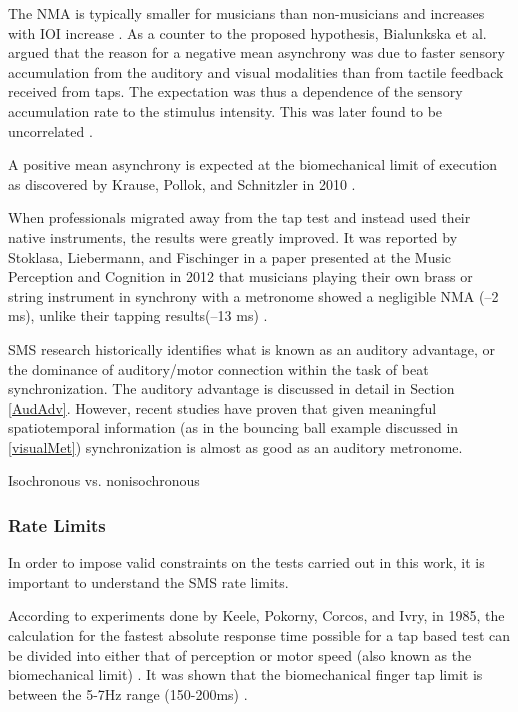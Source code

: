 The NMA is typically smaller for musicians than non-musicians and increases with IOI increase \cite{repp2013sensorimotor}. As a counter to the proposed hypothesis, Bialunkska et al. argued that the reason for a negative mean asynchrony was due to faster sensory accumulation from the auditory and visual modalities than from tactile feedback received from taps. The expectation was thus a dependence of the sensory accumulation rate to the stimulus intensity. This was later found to be uncorrelated \cite{bialunska2011increasing}.

A positive mean asynchrony is expected at the biomechanical limit of execution as discovered by Krause, Pollok, and Schnitzler in 2010 \cite{krause2010perception}.

When professionals migrated away from the tap test and instead used their native instruments, the results were greatly improved. It was reported by Stoklasa, Liebermann, and Fischinger in a paper presented at the Music Perception and Cognition in 2012 that musicians playing their own brass or string instrument in synchrony with a metronome showed a negligible NMA (–2 ms), unlike their tapping results(–13 ms) \cite{repp2013sensorimotor}.

SMS research historically identifies what is known as an auditory advantage, or the dominance of auditory/motor connection within the task of beat synchronization. The auditory advantage is discussed in detail in Section \ref{AudAdv}. However, recent studies have proven that given meaningful spatiotemporal information (as in the bouncing ball example discussed in \ref{visualMet}) synchronization is almost as good as an auditory metronome.

Isochronous vs. nonisochronous ~\cite{polak2016both}

\subsubsection{Rate Limits} \label{rateLimits}
In order to impose valid constraints on the tests carried out in this work, it is important to understand the SMS rate limits. 

According to experiments done by Keele, Pokorny, Corcos, and Ivry, in 1985, the calculation for the fastest absolute response time possible for a tap based test can be divided into either that of perception or motor speed (also known as the biomechanical limit) \cite{keele1985perception}. It was shown that the biomechanical finger tap limit is between the 5-7Hz range (150-200ms) \cite{repp2006rate}.

